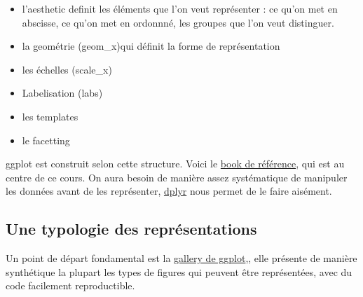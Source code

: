 \documentclass[
]{book}
\providecommand{\tightlist}{%
  \setlength{\itemsep}{0pt}\setlength{\parskip}{0pt}}
\begin{document}
\begin{itemize}
\tightlist
\item
  l'aesthetic definit les éléments que l'on veut représenter : ce qu'on met en abscisse, ce qu'on met en ordonnné, les groupes que l'on veut distinguer.
\item
  la geométrie (geom\_x)qui définit la forme de représentation
\item
  les échelles (scale\_x)
\item
  Labelisation (labs)
\item
  les templates
\item
  le facetting
\end{itemize}

ggplot est construit selon cette structure. Voici le \href{https://ggplot2-book.org/}{book de référence}, qui est au centre de ce cours. On aura besoin de manière assez systématique de manipuler les données avant de les représenter, \href{http://larmarange.github.io/analyse-R/manipuler-les-donnees-avec-dplyr.html}{dplyr} nous permet de le faire aisément.

\hypertarget{une-typologie-des-repruxe9sentations}{%
\subsection{Une typologie des représentations}\label{une-typologie-des-repruxe9sentations}}

Un point de départ fondamental est la \href{https://www.r-graph-gallery.com/}{gallery de ggplot},, elle présente de manière synthétique la plupart les types de figures qui peuvent être représentées, avec du code facilement reproductible.
\end{document}
